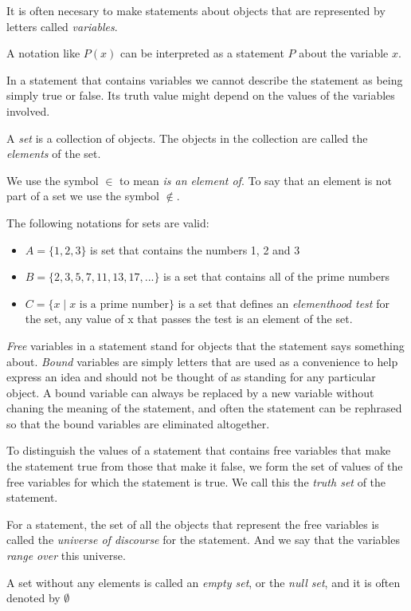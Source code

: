 It is often necesary to make statements about objects that are represented by letters called \textit{variables}.

A notation like \(P(x)\) can be interpreted as a statement \(P\) about the variable \(x\).

In a statement that contains variables we cannot describe the statement as being simply true or false. Its truth value might depend on the values of the variables involved.

A \textit{set} is a collection of objects. The objects in the collection are called the \textit{elements} of the set.

We use the symbol \(\in\) to mean \textit{is an element of}. To say that an element is not part of a set we use the symbol \(\notin\).

The following notations for sets are valid:
\begin{itemize}
    \item \(A = \{1,2,3\}\) is set that contains the numbers 1, 2 and 3
    \item \(B = \{2,3,5,7,11,13,17,...\}\) is a set that contains all of the prime numbers
    \item \(C = \{x \mid x \text{ is a prime number}\}\) is a set that defines an \textit{elementhood test} for the set, any value of x that passes the test is an element of the set.
\end{itemize}

\textit{Free} variables in a statement stand for objects that the statement says something about. \textit{Bound} variables are simply letters that are used as a convenience to help express an idea and should not be thought of as standing for any particular object. A bound variable can always be replaced by a new variable without chaning the meaning of the statement, and often the statement can be rephrased so that the bound variables are eliminated altogether.

To distinguish the values of a statement that contains free variables that make the statement true from those that make it false, we form the set of values of the free variables for which the statement is true. We call this the \textit{truth set} of the statement.

For a statement, the set of all the objects that represent the free variables is called the \textit{universe of discourse} for the statement. And we say that the variables \textit{range over} this universe.

A set without any elements is called an \textit{empty set}, or the \textit{null set}, and it is often denoted by $\emptyset$